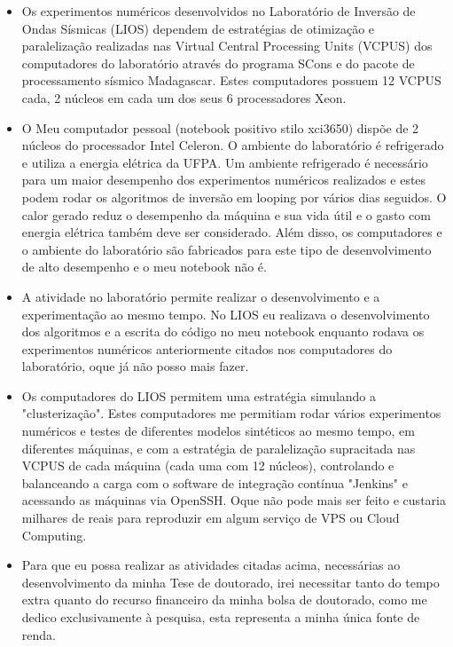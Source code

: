 \begin{itemize}


\item Os experimentos numéricos desenvolvidos no Laboratório de Inversão de Ondas Sísmicas (LIOS) dependem de estratégias de otimização e paralelização realizadas nas Virtual Central Processing Units (VCPUS) dos computadores do laboratório através do programa SCons e do pacote de processamento sísmico Madagascar.
Estes computadores possuem 12 VCPUS cada, 2 núcleos em cada um dos seus 6 processadores Xeon.

\item O Meu computador pessoal (notebook positivo stilo xci3650) dispõe de 2 núcleos do processador Intel Celeron. O ambiente do laboratório é refrigerado e utiliza a energia elétrica da UFPA. Um ambiente refrigerado é necessário para um maior desempenho dos experimentos numéricos realizados e estes podem rodar os algoritmos de inversão em looping por vários dias seguidos. O calor gerado reduz o desempenho da máquina e sua vida útil e o gasto com energia elétrica também deve ser considerado. Além disso, os computadores e o ambiente do laboratório são fabricados para este tipo de desenvolvimento de
alto desempenho e o meu notebook não é.

\item A atividade no laboratório permite realizar o desenvolvimento e a experimentação ao mesmo tempo. No LIOS eu realizava o desenvolvimento dos algoritmos e a escrita do código no meu notebook enquanto rodava os experimentos numéricos anteriormente citados nos computadores do laboratório, oque já não posso mais fazer.

\item Os computadores do LIOS permitem uma estratégia simulando a "clusterização". Estes computadores me permitiam rodar vários experimentos numéricos e testes de diferentes modelos sintéticos ao mesmo tempo, em diferentes máquinas, e com a estratégia de paralelização supracitada nas VCPUS de cada máquina (cada uma com 12 núcleos), controlando e balanceando a carga com o software de integração contínua "Jenkins" e acessando as máquinas via OpenSSH.
Oque não pode mais ser feito e custaria milhares de reais para reproduzir em algum serviço de VPS ou Cloud Computing.

\item Para que eu possa realizar as atividades citadas acima, necessárias ao desenvolvimento da minha Tese de doutorado, irei necessitar tanto do tempo extra quanto do recurso financeiro da minha bolsa de doutorado, como me dedico exclusivamente à pesquisa, esta representa a minha única fonte de renda.

\end{itemize}

